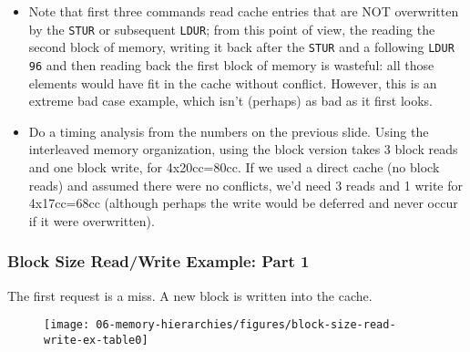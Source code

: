 {\begin{frame}[fragile]
\begin{itemize}
		The first \texttt{LDUR} is a cache miss; the second and third
		are cache hits; the fourth causes a cache read, loading
		M[352], M[360], M[368], M[376], and then overwriting
		M[368]; the fifth (a cache hit) shows why we need to read 
		when doing a write; the 6th line
		causes a cache write to memory and
		a cache read of the first block of memory addresses.
	\item Note that first three commands read cache entries that
		are NOT overwritten by the \texttt{STUR} or subsequent
		\texttt{LDUR}; from this
		point of view, the reading the second block of memory,
		writing it back after the \texttt{STUR} and a following
		\texttt{LDUR 96} and then reading back the first block of
		memory is wasteful: all those elements would have fit
		in the cache without conflict.  However, this is an
		extreme bad case example, which isn't (perhaps) as bad
		as it first looks.
	\item Do a timing analysis from the numbers on the previous
		slide.  Using the interleaved memory organization, using
		the block version takes 3 block reads and one block write,
		for 4x20cc=80cc.  If we used a direct cache (no block reads)
		and assumed there were no conflicts, we'd need 3
		reads and 1 write for 4x17cc=68cc (although perhaps the
		write would be deferred and never occur if it were overwritten).
\end{itemize}
\fi\ENotes
\end{frame}
\begin{frame}\frametitle{Block Size Read/Write Example: Part 1}
The first request is a miss. A new block is written into the cache.
\begin{figure}[H]
\centering
{\texttt{[image: 06-memory-hierarchies/figures/block-size-read-write-ex-table0]}}
\end{figure}
\end{frame}

}
